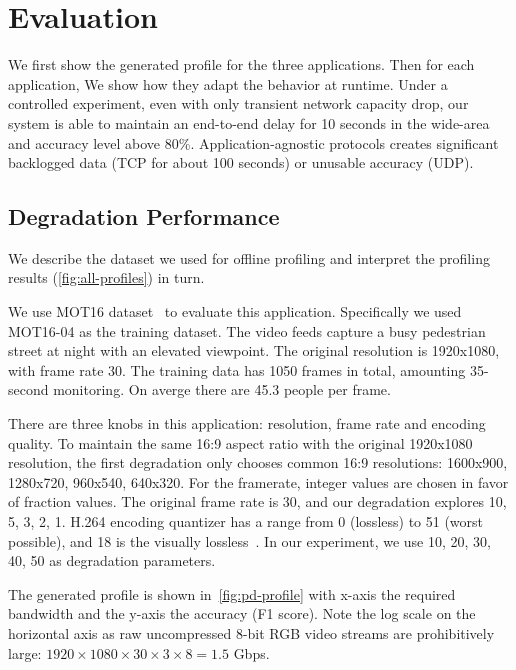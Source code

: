 \section{Evaluation}
\label{sec:evaluation}

We first show the generated profile for the three applications. Then for each
application, We show how they adapt the behavior at runtime. Under a controlled
experiment, even with only transient network capacity drop, our system is able
to maintain an end-to-end delay for 10 seconds in the wide-area and accuracy
level above 80\%. Application-agnostic protocols creates significant backlogged
data (TCP for about 100 seconds) or unusable accuracy (UDP).

\subsection{Degradation Performance}
\label{sec:degr-perf}

We describe the dataset we used for offline profiling and interpret the
profiling results (\autoref{fig:all-profiles}) in turn.

 We use MOT16 dataset~\cite{milan2016mot16} to
evaluate this application. Specifically we used MOT16-04 as the training
dataset. The video feeds capture a busy pedestrian street at night with an
elevated viewpoint. The original resolution is 1920x1080, with frame rate
30. The training data has 1050 frames in total, amounting 35-second monitoring.
On averge there are 45.3 people per frame.

There are three knobs in this application: resolution, frame rate and encoding
quality. To maintain the same 16:9 aspect ratio with the original 1920x1080
resolution, the first degradation only chooses common 16:9 resolutions:
1600x900, 1280x720, 960x540, 640x320. For the framerate, integer values are
chosen in favor of fraction values. The original frame rate is 30, and our
degradation explores 10, 5, 3, 2, 1. H.264 encoding quantizer has a range from 0
(lossless) to 51 (worst possible), and 18 is the visually
lossless~\cite{bellard2012ffmpeg}. In our experiment, we use 10, 20, 30, 40, 50
as degradation parameters.

The generated profile is shown in~\autoref{fig:pd-profile} with x-axis the
required bandwidth and the y-axis the accuracy (F1 score). Note the log scale on
the horizontal axis as raw uncompressed 8-bit RGB video streams are
prohibitively large: $1920 \times 1080 \times 30 \times 3 \times 8 = 1.5 $ Gbps.

